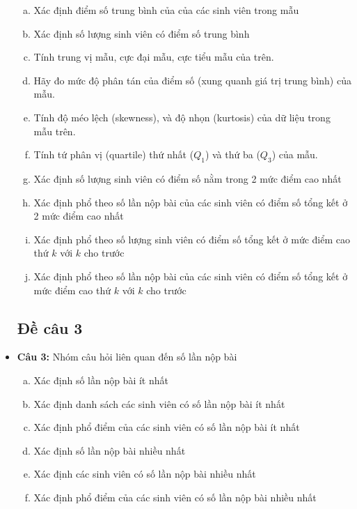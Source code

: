\documentclass[a4paper]{article}
\theoremstyle{definition}
\begin{document}
\begin{itemize}
\begin{enumerate}[a)]
  \item Xác định điểm số trung bình của của các sinh viên trong mẫu
  \item Xác định số lượng sinh viên có điểm số trung bình 
  \item Tính trung vị mẫu, cực đại mẫu, cực tiểu mẫu của trên.
  \item Hãy đo mức độ phân tán của điểm số (xung quanh giá trị trung bình) của  mẫu.
  \item Tính độ méo lệch (skewness), và độ nhọn (kurtosis) của dữ liệu trong mẫu trên.
  \item Tính tứ phân vị (quartile) thứ nhất ($Q_1$) và thứ ba ($Q_3$) của mẫu.
  
  \item {Xác định số lượng sinh viên có điểm số nằm trong 2 mức điểm cao nhất}
  \item {Xác định phổ theo số lần nộp bài của các sinh viên có điểm số tổng kết ở 2 mức điểm cao nhất}
  \item {Xác định phổ theo số lượng sinh viên có điểm số tổng kết ở mức điểm cao thứ $k$ với $k$ cho trước}
  \item {Xác định phổ theo số lần nộp bài của các sinh viên có điểm số tổng kết ở mức điểm cao thứ $k$ với $k$ cho trước}
\end{enumerate}

\subsection{Đề câu 3}
\item[] {\textbf{Câu 3: }Nhóm câu hỏi liên quan đến số lần nộp bài}
\begin{enumerate}[a)]
  \item {Xác định số lần nộp bài ít nhất}
  \item {Xác định danh sách các sinh viên có số lần nộp bài ít nhất}
  \item {Xác định phổ điểm của các sinh viên có số lần nộp bài ít nhất}
  \item {Xác định số lần nộp bài nhiều nhất}
  \item {Xác định các sinh viên có số lần nộp bài nhiều nhất}
  \item {Xác định phổ điểm của các sinh viên có số lần nộp bài nhiều nhất}
   

\end{enumerate}
\end{itemize}
\end{document}
